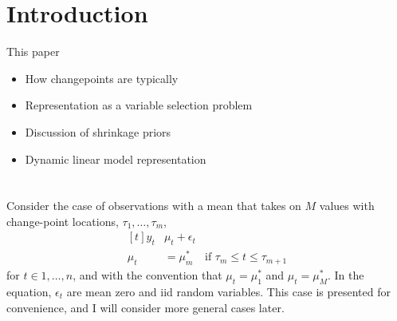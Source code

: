 
\section{Introduction}
\label{dlm:sec:introduction}

This paper 


\begin{itemize}
\item How changepoints are typically 
\item Representation as a variable selection problem
\item Discussion of shrinkage priors
\item Dynamic linear model representation
\end{itemize}

\section{}

Consider the case of observations with a mean that takes on $M$ values with change-point locations, $\tau_{1}, \dots, \tau_{m}$,
\begin{equation}
  \label{dlm:eq:1}
  \begin{aligned}[t]
    y_{t} & \mu_{t} + \epsilon_{t} \\
    \mu_{t} &= \mu^{*}_{m} & \text{if $\tau_{m} \leq t \leq \tau_{m + 1}$}
  \end{aligned}
\end{equation}
for $t \in 1, \dots, n$, and with the convention that  $\mu_{t} = \mu^{*}_{1}$ and $\mu_{t} = \mu^{*}_{M}$.
In the equation, $\epsilon_{t}$ are mean zero and iid random variables.
This case is presented for convenience, and I will consider more general cases later.

